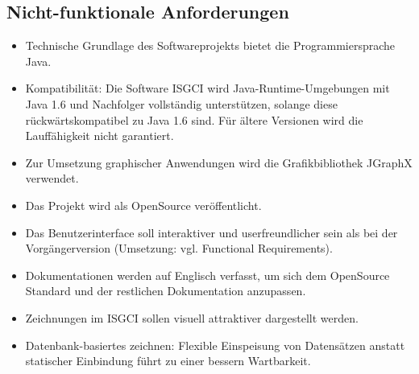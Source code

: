 \documentclass[11pt,a4paper]{article}
\begin{document}
	
	\subsection{Nicht-funktionale Anforderungen} %
		\begin{itemize}
		\item Technische Grundlage des Softwareprojekts bietet die Programmiersprache Java.
		\item Kompatibilität: Die Software ISGCI wird Java-Runtime-Umgebungen mit Java 1.6 und Nachfolger vollständig unterstützen, solange diese rückwärtskompatibel zu Java 1.6 sind. Für ältere Versionen wird die Lauffähigkeit nicht garantiert.
		\item Zur Umsetzung graphischer Anwendungen wird die Grafikbibliothek JGraphX verwendet.
		\item Das Projekt wird als OpenSource veröffentlicht.
		\item Das Benutzerinterface soll interaktiver und userfreundlicher sein als bei der Vorgängerversion (Umsetzung: vgl. Functional Requirements).
		\item Dokumentationen werden auf Englisch verfasst, um sich dem OpenSource Standard und der restlichen Dokumentation anzupassen.
		\item Zeichnungen im ISGCI sollen visuell attraktiver dargestellt werden.
		\item Datenbank-basiertes zeichnen: Flexible Einspeisung von Datensätzen anstatt statischer Einbindung führt zu einer bessern Wartbarkeit.
		\end{itemize}
		
\end{document}
